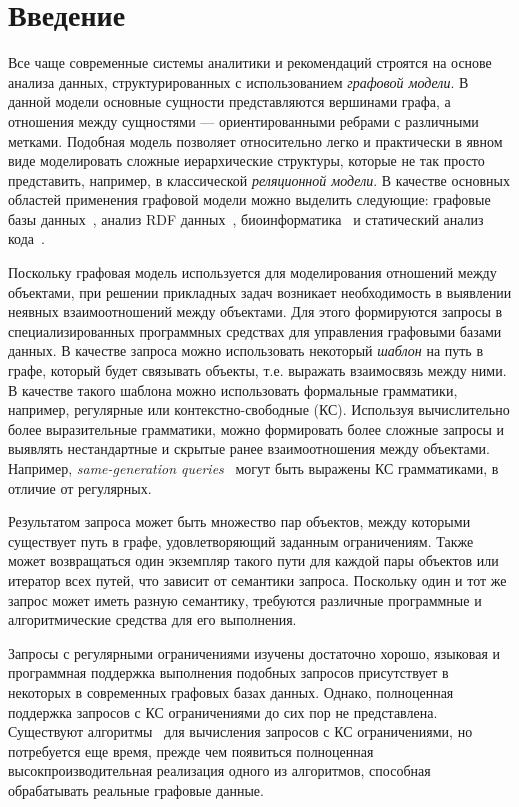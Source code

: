 \section*{Введение}

Все чаще современные системы аналитики и рекомендаций строятся на основе анализа данных, структурированных с использованием \textit{графовой модели}. В данной модели основные сущности представляются вершинами графа, а отношения между сущностями --- ориентированными ребрами с различными метками. Подобная модель позволяет относительно легко и практически в явном виде моделировать сложные иерархические структуры, которые не так просто представить, например, в классической \textit{реляционной модели}. В качестве основных областей применения графовой модели можно выделить следующие: графовые базы данных~\cite{article:querying_graph_databases}, анализ RDF данных~\cite{article:cfpq_and_rdf_analysis}, биоинформатика~\cite{article:rna_prediction} и статический анализ кода~\cite{article:dyck_cfl_code_analysis}.

Поскольку графовая модель используется для моделирования отношений между объектами, при решении прикладных задач возникает необходимость в выявлении неявных взаимоотношений между объектами. Для этого  формируются запросы в специализированных программных средствах для управления графовыми базами данных. В качестве запроса можно использовать некоторый \textit{шаблон} на путь в графе, который будет связывать объекты, т.е. выражать взаимосвязь между ними. В качестве такого шаблона можно использовать формальные грамматики, например, регулярные или контекстно-свободные (КС). Используя вычислительно более выразительные грамматики, можно формировать более сложные запросы и выявлять нестандартные и скрытые ранее взаимоотношения между объектами. Например, \textit{same-generation queries}~\cite{inbook:databases_intro} могут быть выражены КС грамматиками, в отличие от регулярных.

Результатом запроса может быть множество пар объектов, между которыми существует путь в графе, удовлетворяющий заданным ограничениям. Также может возвращаться один экземпляр такого пути для каждой пары объектов или итератор всех путей, что зависит от семантики запроса. Поскольку один и тот же запрос может иметь разную семантику, требуются различные программные и алгоритмические средства для его выполнения.  

Запросы с регулярными ограничениями изучены достаточно хорошо, языковая и программная поддержка выполнения подобных запросов присутствует в некоторых в современных графовых базах данных. Однако, полноценная поддержка запросов с КС ограничениями до сих пор не представлена. Существуют алгоритмы~\cite{article:cfpq_and_rdf_analysis, article:hellings_cfpq, inproceedings:matrix_cfpq, inbook:kronecker_cfpq_adbis, article:cfpq_go_for_rdf} для вычисления запросов с КС ограничениями, но потребуется еще время, прежде чем появиться полноценная высокпроизводительная реализация одного из алгоритмов, способная обрабатывать реальные графовые данные.

